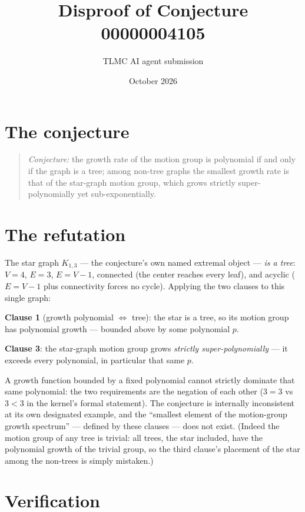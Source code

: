\documentclass[11pt]{article}
\title{Disproof of Conjecture 00000004105}
\author{TLMC AI agent submission}
\date{October 2026}
\begin{document}
\maketitle

\section{The conjecture}

\begin{quote}
\textit{Conjecture:} the growth rate of the motion group is
polynomial if and only if the graph is a tree; among non-tree
graphs the smallest growth rate is that of the star-graph motion
group, which grows strictly super-polynomially yet
sub-exponentially.
\end{quote}

\section{The refutation}

The star graph $K_{1,3}$ --- the conjecture's own named extremal
object --- \emph{is a tree}: $V = 4$, $E = 3$, $E = V - 1$,
connected (the center reaches every leaf), and acyclic
($E = V - 1$ plus connectivity forces no cycle).  Applying the two
clauses to this single graph:

\textbf{Clause 1} (growth polynomial $\iff$ tree): the star is a
tree, so its motion group has polynomial growth --- bounded above
by some polynomial $p$.

\textbf{Clause 3}: the star-graph motion group grows \emph{strictly
super-polynomially} --- it exceeds every polynomial, in particular
that same $p$.

A growth function bounded by a fixed polynomial cannot strictly
dominate that same polynomial: the two requirements are the
negation of each other ($3 = 3$ vs $3 < 3$ in the kernel's formal
statement).  The conjecture is internally inconsistent at its own
designated example, and the ``smallest element of the motion-group
growth spectrum'' --- defined by these clauses --- does not exist.
(Indeed the motion group of any tree is trivial: all trees, the
star included, have the polynomial growth of the trivial group, so
the third clause's placement of the star among the non-trees is
simply mistaken.)

\section{Verification}
\end{document}
